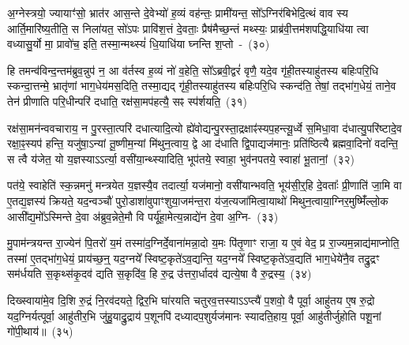 {\anuvakamend[{आ॒साद्य॒ प्रान॑तिदृश्ञं करोति हरति वियु॒याद्यज॑मानमे॒वाग्निरिति॑ स॒प्तद॑श च}]}

अ॒ग्नेस्त्रयो॒ ज्यायाꣳ॑सो॒ भ्रात॑र आस॒न्ते दे॒वेभ्यो॑ ह॒व्यं वह॑न्तः॒ प्रामी॑यन्त॒ सो᳚\-ऽग्निर॑बिभेदि॒त्थं वाव स्य आर्ति॒मारि॑ष्य॒तीति॒ स निला॑यत॒ सो॑\-ऽपः प्रावि॑श॒त्तं दे॒वताः॒ प्रैष॑मैच्छ॒न्तं मथ्स्यः॒ प्राब्र॑वी॒त्तम॑शपद्धि॒याधि॑या त्वा वध्यासु॒र्यो मा॒ प्रावो॑च॒ इति॒ तस्मा॒न्मथ्स्यं॑ धि॒याधि॑या घ्नन्ति श॒प्तो~-~(३०)\ip

हि तमन्व॑विन्द॒न्तम॑ब्रुव॒न्नुप॑ न॒ आ व॑र्तस्व ह॒व्यं नो॑ व॒हेति॒ सो᳚\-ऽब्रवी॒द्वरं॑ वृणै॒ यदे॒व गृ॑ही॒तस्याहु॑तस्य बहिःपरि॒धि स्कन्दा॒त्तन्मे॒ भ्रातृ॑णां भाग॒धेय॑मस॒दिति॒ तस्मा॒द्यद् गृ॑ही॒तस्याहु॑तस्य बहिःपरि॒धि स्कन्द॑ति॒ तेषां॒ तद्भा॑ग॒धेयं॒ ताने॒व तेन॑ प्रीणाति परि॒धीन्परि॑ दधाति॒ रक्ष॑सा॒मप॑हत्यै॒ सꣴ स्प॑र्\mbox{}शयति॒~(३१)\ip

रक्ष॑सा॒मन॑न्ववचाराय॒ न पु॒रस्ता॒त्परि॑ दधात्यादि॒त्यो ह्ये॑वोद्यन्पु॒रस्ता॒द्\-रक्षाꣴ॑स्यप॒हन्त्यू॒र्ध्वे स॒मिधा॒वा द॑धात्यु॒परि॑ष्टादे॒व रक्षा॒ꣴ॒स्यप॑ हन्ति॒ यजु॑षा॒\-ऽन्यां तू॒ष्णीम॒न्यां मि॑थुन॒त्वाय॒ द्वे आ द॑धाति द्वि॒पाद्यज॑मानः॒ प्रति॑ष्ठित्यै ब्रह्मवा॒दिनो॑ वदन्ति॒ स त्वै य॑जेत॒ यो य॒ज्ञस्या\-ऽऽ\-र्त्या॒ वसी॑या॒न्थ्स्यादिति॒ भूप॑तये॒ स्वाहा॒ भुव॑नपतये॒ स्वाहा॑ भू॒तानां॒~(३२)\ip

पत॑ये॒ स्वाहेति॑ स्क॒न्नमनु॑ मन्त्रयेत य॒ज्ञस्यै॒व तदार्त्या॒ यज॑मानो॒ वसी॑यान्भवति॒ भूय॑सी॒र्॒\mbox{}हि दे॒वताः᳚ प्री॒णाति॑ जा॒मि वा ए॒तद्य॒ज्ञस्य॑ क्रियते॒ यद॒न्वञ्चौ॑ पुरो॒डाशा॑वुपाꣳशुया॒जम॑\-न्त॒रा य॑ज॒त्यजा॑मित्वा॒याथो॑ मिथुन॒त्वाया॒ग्निर॒मुष्मिँ॑ल्लो॒क आसी᳚द्य॒मो᳚\-ऽस्मिन्ते दे॒वा अ॑ब्रुव॒न्नेते॒मौ वि पर्यू॑हा॒मेत्य॒न्नाद्ये॑न दे॒वा अ॒ग्नि-~(३३)\ip

मु॒पाम॑न्त्रयन्त रा॒ज्येन॑ पि॒तरो॑ य॒मं तस्मा॑द॒ग्निर्दे॒वाना॑मन्ना॒दो य॒मः पि॑तृ॒णाꣳ राजा॒ य ए॒वं वेद॒ प्र रा॒ज्यम॒न्नाद्य॑माप्नोति॒ तस्मा॑ ए॒तद्भा॑ग॒धेयं॒ प्राय॑च्छ॒न्॒ यद॒ग्नये᳚ स्विष्ट॒कृते॑\-ऽव॒द्यन्ति॒ यद॒ग्नये᳚ स्विष्ट॒कृते॑\-ऽव॒द्यति॑ भाग॒धेये॑नै॒व तद्रु॒द्रꣳ सम॑र्धयति स॒कृथ्स॑कृ॒दव॑ द्यति स॒कृदि॑व॒ हि रु॒द्र उ॑त्तरा॒र्धादव॑ द्यत्ये॒षा वै रु॒द्रस्य॒~(३४)\ip

दिख्स्वाया॑मे॒व दि॒शि रु॒द्रं नि॒रव॑दयते॒ द्विर॒भि घा॑रयति चतुरव॒त्तस्या\-ऽऽ\-प्त्यै॑ प॒शवो॒ वै पूर्वा॒ आहु॑तय ए॒ष रु॒द्रो यद॒ग्निर्यत्पूर्वा॒ आहु॑तीर॒भि जु॑हु॒याद्रु॒द्राय॑ प॒शूनपि॑ दध्यादप॒शुर्यज॑मानः स्यादति॒हाय॒ पूर्वा॒ आहु॑तीर्जुहोति पशू॒नां गो॑पी॒थाय॑॥~(३५)\ip

{}

